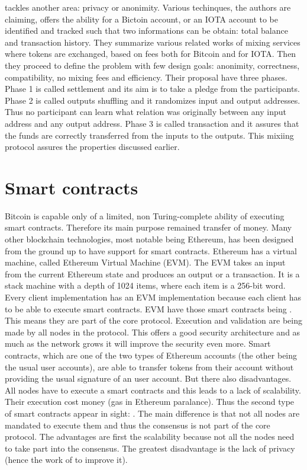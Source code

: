 \documentclass[a4paper,12pt,twoside]{book}
\begin{document}
    \cite{PrivacyAwareIOTALedger} tackles another area: privacy or anonimity. Various techinques, the authors are claiming, offers the ability for a Bictoin account, or an IOTA account to be identified and tracked such that two informations can be obtain: total balance and transaction history. They summarize various related works of mixing services where tokens are exchanged, based on fees both for Bitcoin and for IOTA. Then they proceed to define the problem with few design goals: anonimity, correctness, compatibility, no mixing fees and efficiency. Their proposal have three phases. Phase 1 is called settlement and its aim is to take a pledge from the participants. Phase 2 is called outputs shuffling and it randomizes input and output addresses. Thus no participant can learn what relation was originally between any input address and any output address. Phase 3 is called transaction and it assures that the funds are correctly transferred from the inputs to the outputs. This mixiing protocol assures the properties discussed earlier.

\section{Smart contracts}
\label{sec:SmartContracts}

    Bitcoin is capable only of a limited, non Turing-complete ability of executing smart contracts. Therefore its main purpose remained transfer of money. Many other blockchain technologies, most notable being Ethereum, has been designed from the ground up to have support for smart contracts. Ethereum has a virtual machine, called Ethereum Virtual Machine (EVM). The EVM takes an input from the current Ethereum state and produces an output or a transaction. It is a stack machine with a depth of 1024 items, where each item is a 256-bit word. Every client implementation has an EVM implementation because each client has to be able to execute smart contracts. EVM have those smart contracts being . This means they are part of the core protocol. Execution and validation are being made by all nodes in the protocol. This offers a good security architecture and as much as the network grows it will improve the security even more. Smart contracts, which are one of the two types of Ethereum accounts (the other being the usual user accounts), are able to transfer tokens from their account without providing the usual signature of an user account. But there also disadvantages. All nodes have to execute a smart contracts and this leads to a lack of scalability. Their execution cost money (gas in Ethereum paralance). Thus the second type of smart contracts appear in sight: . The main difference is that not all nodes are mandated to execute them and thus the consensus is not part of the core protocol. The advantages are first the scalability because not all the nodes need to take part into the consensus. The greatest disadvantage is the lack of privacy (hence the work of \cite{PrivacyAwareIOTALedger} to improve it).
\end{document}
